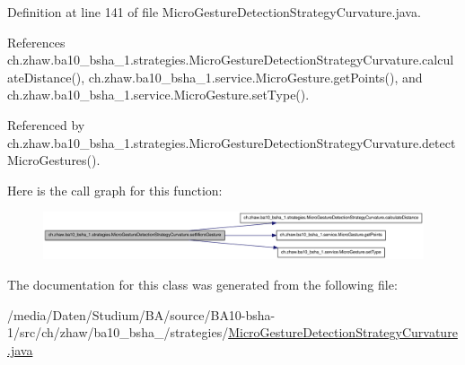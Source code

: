 Definition at line 141 of file MicroGestureDetectionStrategyCurvature.java.

References ch.zhaw.ba10\_\-bsha\_\-1.strategies.MicroGestureDetectionStrategyCurvature.calculateDistance(), ch.zhaw.ba10\_\-bsha\_\-1.service.MicroGesture.getPoints(), and ch.zhaw.ba10\_\-bsha\_\-1.service.MicroGesture.setType().

Referenced by ch.zhaw.ba10\_\-bsha\_\-1.strategies.MicroGestureDetectionStrategyCurvature.detectMicroGestures().

Here is the call graph for this function:\nopagebreak
\begin{figure}[H]
\begin{center}
\leavevmode
\includegraphics[width=420pt]{classch_1_1zhaw_1_1ba10__bsha__1_1_1strategies_1_1MicroGestureDetectionStrategyCurvature_a8e53337041e648e2e5f9c72cc74d7a0e_cgraph}
\end{center}
\end{figure}


The documentation for this class was generated from the following file:\begin{DoxyCompactItemize}
\item 
/media/Daten/Studium/BA/source/BA10-\/bsha-\/1/src/ch/zhaw/ba10\_\-bsha\_/strategies/\hyperlink{MicroGestureDetectionStrategyCurvature_8java}{MicroGestureDetectionStrategyCurvature.java}\end{DoxyCompactItemize}
